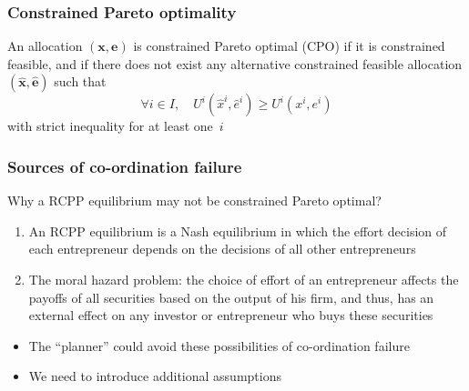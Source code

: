 \documentclass[blue]{beamer}
\def\geq{\geqslant}
\theoremstyle{definition}
\theoremstyle{example}
\begin{document}

\begin{frame}\frametitle{Constrained Pareto optimality}

\begin{definition}
An allocation $(\bm{x},\bm{e})$ is \alert{constrained Pareto optimal} (CPO) if it is constrained feasible, and if there does not exist any alternative constrained feasible allocation
$(\widehat{\bm{x}},\widehat{\bm{e}})$ such that
\[
\forall i\in I, \quad U^i(\widehat{x}^i,\widehat{e}^i) \geq U^i(x^i,e^i)
\]
with strict inequality for at least one~$i$
\end{definition}

\end{frame}


\begin{frame}\frametitle{Sources of co-ordination failure}

Why a RCPP equilibrium may not be constrained Pareto optimal?
\begin{enumerate}
\item An RCPP equilibrium is a Nash equilibrium in which the effort decision of each entrepreneur depends on the decisions of all other entrepreneurs
\item The moral hazard problem: the choice of effort of an entrepreneur affects the payoffs of all securities based on the output of his firm, and thus, has an external effect on any investor or
entrepreneur who buys these securities
\end{enumerate}

\begin{itemize}
\item The ``planner'' could avoid these possibilities of co-ordination failure
\item We need to introduce additional assumptions
\end{itemize}

\end{frame}

\end{document}
